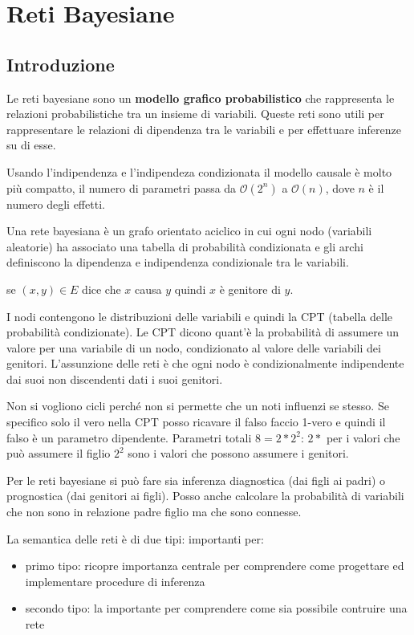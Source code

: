 \chapter{Reti Bayesiane} \label{cap:RetiBayesiane}
\section{Introduzione}
Le reti bayesiane sono un \textbf{modello grafico probabilistico} che rappresenta le relazioni
probabilistiche tra un insieme di variabili. Queste reti sono utili per rappresentare
le relazioni di dipendenza tra le variabili e per effettuare inferenze su di esse.

Usando l'indipendenza e l'indipendeza condizionata il modello causale è molto più compatto, il
numero di parametri passa da $\mathcal{O}(2^n)$ a $\mathcal{O}(n)$, dove $n$ 
è il numero degli effetti.

\begin{definizione}
    Una rete bayesiana è un grafo orientato aciclico in cui ogni nodo (variabili aleatorie)
    ha associato una tabella di probabilità condizionata e gli archi definiscono 
    la dipendenza e indipendenza condizionale tra le variabili.
\end{definizione}

se $(x,y)\in E$ dice che $x$ causa $y$ quindi $x$ è genitore di $y$.

I nodi contengono le distribuzioni delle variabili e quindi la CPT (tabella delle probabilità condizionate).
Le CPT dicono quant'è la probabilità di assumere un valore per una variabile di un nodo, condizionato al valore delle variabili
dei genitori. L'assunzione delle reti è che ogni nodo è condizionalmente indipendente
dai suoi non discendenti dati i suoi genitori.

Non si vogliono cicli perché non si permette che un noti influenzi se stesso.
Se specifico solo il vero nella CPT posso ricavare il falso faccio 1-vero e quindi
il falso è un parametro dipendente. Parametri totali $8 = 2*2^2$: $2*$ per i valori che può
assumere il figlio $2^2$ sono i valori che possono assumere i genitori.

Per le reti bayesiane si può fare sia inferenza diagnostica (dai figli ai padri) o prognostica (dai genitori ai figli).
Posso anche calcolare la probabilità di variabili che non sono in relazione padre figlio ma che sono
connesse.

La semantica delle reti è di due tipi:
importanti per:
\begin{itemize}
    \item primo tipo: ricopre importanza centrale per comprendere come progettare ed implementare procedure di inferenza
    \item secondo tipo: la importante per comprendere come sia possibile  contruire una rete
\end{itemize}

